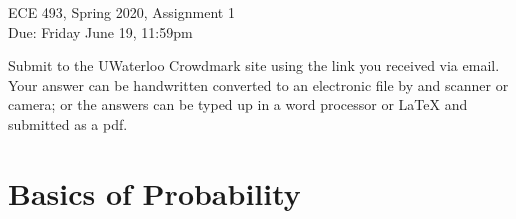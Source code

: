 \documentclass[11pt,onecolumn]{article}
\begin{document}
\begin{center}
\begin{Large}
ECE 493, Spring 2020, Assignment 1\\
Due: Friday June 19, 11:59pm
\end{Large}
\end{center}
\vspace{.2em}

\vspace{.2em}
\begin{center}
Submit to the UWaterloo Crowdmark site using the link you received via email.
Your answer can be handwritten converted to an electronic file by and scanner or camera; or the answers can be typed up in a word processor or LaTeX and submitted as a pdf.
\end{center}
\vspace{.2em}

\vspace{.2em}


\section{Basics of Probability}
\end{document}
